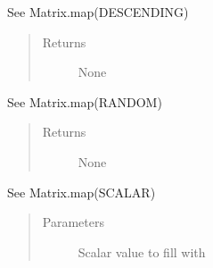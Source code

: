 \documentclass[letterpaper,10pt,english]{sphinxmanual}
\begin{document}
\begin{fulllineitems}
\begin{fulllineitems}
\begin{quote}
\begin{description}
\end{description}\end{quote}

\end{fulllineitems}


\begin{fulllineitems}
\label{\detokenize{libpymath.matrix:libpymath.matrix.matrix.Matrix.fillDescending}}
See Matrix.map(DESCENDING)
\begin{quote}\begin{description}
\item[{Returns}] \leavevmode
None

\end{description}\end{quote}

\end{fulllineitems}


\begin{fulllineitems}
\label{\detokenize{libpymath.matrix:libpymath.matrix.matrix.Matrix.fillRandom}}
See Matrix.map(RANDOM)
\begin{quote}\begin{description}
\item[{Returns}] \leavevmode
None

\end{description}\end{quote}

\end{fulllineitems}


\begin{fulllineitems}
\label{\detokenize{libpymath.matrix:libpymath.matrix.matrix.Matrix.fillScalar}}
See Matrix.map(SCALAR)
\begin{quote}\begin{description}
\item[{Parameters}] \leavevmode
{} \textendash{} Scalar value to fill with


\end{description}
\end{quote}
\end{fulllineitems}
\end{fulllineitems}
\end{document}
